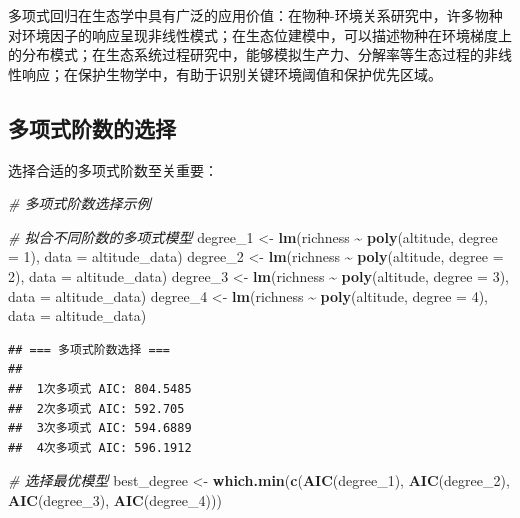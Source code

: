 \documentclass[
  twoside,12pt,fontset=none]{ctexbook}
\newenvironment{Shaded}{\begin{snugshade}}{\end{snugshade}}
\newcommand{\AttributeTok}[1]{\textcolor[rgb]{0.13,0.29,0.53}{#1}}
\newcommand{\CommentTok}[1]{\textcolor[rgb]{0.56,0.35,0.01}{\textit{#1}}}
\newcommand{\DecValTok}[1]{\textcolor[rgb]{0.00,0.00,0.81}{#1}}
\newcommand{\FunctionTok}[1]{\textcolor[rgb]{0.13,0.29,0.53}{\textbf{#1}}}
\newcommand{\NormalTok}[1]{#1}
\newcommand{\OtherTok}[1]{\textcolor[rgb]{0.56,0.35,0.01}{#1}}
\newcommand{\SpecialCharTok}[1]{\textcolor[rgb]{0.81,0.36,0.00}{\textbf{#1}}}
\begin{document}
多项式回归在生态学中具有广泛的应用价值：在物种-环境关系研究中，许多物种对环境因子的响应呈现非线性模式；在生态位建模中，可以描述物种在环境梯度上的分布模式；在生态系统过程研究中，能够模拟生产力、分解率等生态过程的非线性响应；在保护生物学中，有助于识别关键环境阈值和保护优先区域。

\hypertarget{ux591aux9879ux5f0fux9636ux6570ux7684ux9009ux62e9}{%
\subsection{多项式阶数的选择}\label{ux591aux9879ux5f0fux9636ux6570ux7684ux9009ux62e9}}

选择合适的多项式阶数至关重要：

\begin{Shaded}
\begin{Highlighting}[]
\CommentTok{\# 多项式阶数选择示例}

\CommentTok{\# 拟合不同阶数的多项式模型}
\NormalTok{degree\_1 }\OtherTok{\textless{}{-}} \FunctionTok{lm}\NormalTok{(richness }\SpecialCharTok{\textasciitilde{}} \FunctionTok{poly}\NormalTok{(altitude, }\AttributeTok{degree =} \DecValTok{1}\NormalTok{), }\AttributeTok{data =}\NormalTok{ altitude\_data)}
\NormalTok{degree\_2 }\OtherTok{\textless{}{-}} \FunctionTok{lm}\NormalTok{(richness }\SpecialCharTok{\textasciitilde{}} \FunctionTok{poly}\NormalTok{(altitude, }\AttributeTok{degree =} \DecValTok{2}\NormalTok{), }\AttributeTok{data =}\NormalTok{ altitude\_data)}
\NormalTok{degree\_3 }\OtherTok{\textless{}{-}} \FunctionTok{lm}\NormalTok{(richness }\SpecialCharTok{\textasciitilde{}} \FunctionTok{poly}\NormalTok{(altitude, }\AttributeTok{degree =} \DecValTok{3}\NormalTok{), }\AttributeTok{data =}\NormalTok{ altitude\_data)}
\NormalTok{degree\_4 }\OtherTok{\textless{}{-}} \FunctionTok{lm}\NormalTok{(richness }\SpecialCharTok{\textasciitilde{}} \FunctionTok{poly}\NormalTok{(altitude, }\AttributeTok{degree =} \DecValTok{4}\NormalTok{), }\AttributeTok{data =}\NormalTok{ altitude\_data)}
\end{Highlighting}
\end{Shaded}

\begin{verbatim}
## === 多项式阶数选择 ===
## 
##  1次多项式 AIC: 804.5485 
##  2次多项式 AIC: 592.705 
##  3次多项式 AIC: 594.6889 
##  4次多项式 AIC: 596.1912
\end{verbatim}

\begin{Shaded}
\begin{Highlighting}[]
\CommentTok{\# 选择最优模型}
\NormalTok{best\_degree }\OtherTok{\textless{}{-}} \FunctionTok{which.min}\NormalTok{(}\FunctionTok{c}\NormalTok{(}\FunctionTok{AIC}\NormalTok{(degree\_1), }\FunctionTok{AIC}\NormalTok{(degree\_2),}
                           \FunctionTok{AIC}\NormalTok{(degree\_3), }\FunctionTok{AIC}\NormalTok{(degree\_4)))}
\end{Highlighting}
\end{Shaded}
\end{document}
